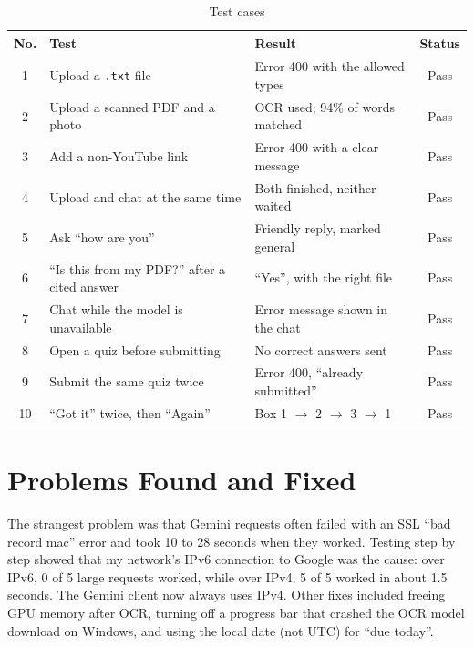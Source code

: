 \documentclass[12pt,a4paper]{report}
\newcommand{\code}[1]{\texttt{#1}}
\begin{document}
\begin{table}[H]
\centering
\caption{Test cases}\label{tab:tests}
\small
\begin{tabularx}{\textwidth}{@{}cP{5.4cm}Lc@{}}
\toprule
\textbf{No.} & \textbf{Test} & \textbf{Result} & \textbf{Status} \\
  & Upload a \code{.txt} file                & Error 400 with the allowed types & Pass \\
2  & Upload a scanned PDF and a photo         & OCR used; 94\% of words matched & Pass \\
3  & Add a non-YouTube link                   & Error 400 with a clear message & Pass \\
4  & Upload and chat at the same time         & Both finished, neither waited & Pass \\
5  & Ask ``how are you''                      & Friendly reply, marked general & Pass \\
6  & ``Is this from my PDF?'' after a cited answer & ``Yes'', with the right file & Pass \\
7  & Chat while the model is unavailable      & Error message shown in the chat & Pass \\
8  & Open a quiz before submitting            & No correct answers sent & Pass \\
9  & Submit the same quiz twice               & Error 400, ``already submitted'' & Pass \\
10 & ``Got it'' twice, then ``Again''         & Box 1 $\rightarrow$ 2 $\rightarrow$ 3 $\rightarrow$ 1 & Pass \\
\bottomrule
\end{tabularx}
\end{table}

\section{Problems Found and Fixed}
The strangest problem was that Gemini requests often failed with an SSL ``bad record mac''
error and took 10 to 28 seconds when they worked. Testing step by step showed that my
network's IPv6 connection to Google was the cause: over IPv6, 0 of 5 large requests worked,
while over IPv4, 5 of 5 worked in about 1.5 seconds. The Gemini client now always uses IPv4.
Other fixes included freeing GPU memory after OCR, turning off a progress bar that crashed
the OCR model download on Windows, and using the local date (not UTC) for ``due today''.

\end{document}
